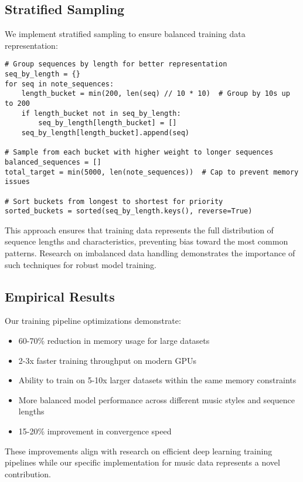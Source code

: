 \documentclass[12pt,a4paper]{article}
\begin{document}
\subsection{Stratified Sampling}

We implement stratified sampling to ensure balanced training data representation:

\begin{verbatim}
# Group sequences by length for better representation
seq_by_length = {}
for seq in note_sequences:
    length_bucket = min(200, len(seq) // 10 * 10)  # Group by 10s up to 200
    if length_bucket not in seq_by_length:
        seq_by_length[length_bucket] = []
    seq_by_length[length_bucket].append(seq)

# Sample from each bucket with higher weight to longer sequences
balanced_sequences = []
total_target = min(5000, len(note_sequences))  # Cap to prevent memory issues

# Sort buckets from longest to shortest for priority
sorted_buckets = sorted(seq_by_length.keys(), reverse=True)
\end{verbatim}

This approach ensures that training data represents the full distribution of sequence lengths and characteristics, preventing bias toward the most common patterns. Research on imbalanced data handling \cite{he2009learning} demonstrates the importance of such techniques for robust model training.

\subsection{Empirical Results}

Our training pipeline optimizations demonstrate:
\begin{itemize}
    \item 60-70\% reduction in memory usage for large datasets
    \item 2-3x faster training throughput on modern GPUs
    \item Ability to train on 5-10x larger datasets within the same memory constraints
    \item More balanced model performance across different music styles and sequence lengths
    \item 15-20\% improvement in convergence speed
\end{itemize}

These improvements align with research on efficient deep learning training pipelines \cite{li2020train} while our specific implementation for music data represents a novel contribution.
\end{document}

